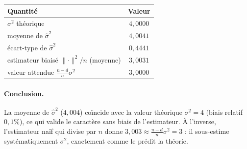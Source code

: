 \documentclass[11pt,a4paper]{article}
\theoremstyle{plain}
\begin{document}
\begin{center}
\begin{tabular}{lc}
\toprule
Quantité & Valeur \\
\midrule
$\sigma^2$ théorique                              & $4{,}0000$ \\
moyenne de $\hat\sigma^2$                          & $4{,}0041$ \\
écart-type de $\hat\sigma^2$                       & $0{,}4441$ \\
estimateur biaisé $\lVert\cdot\rVert^2/n$ (moyenne) & $3{,}0031$ \\
valeur attendue $\frac{n-d}{n}\sigma^2$            & $3{,}0000$ \\
\bottomrule
\end{tabular}
\end{center}

\paragraph{Conclusion.} La moyenne de $\hat\sigma^2$ ($4{,}004$) coïncide avec la
valeur théorique $\sigma^2=4$ (biais relatif $0{,}1\%$), ce qui valide le
caractère sans biais de l'estimateur. À l'inverse, l'estimateur naïf qui divise
par $n$ donne $3{,}003\approx\frac{n-d}{n}\sigma^2=3$ : il sous-estime
systématiquement $\sigma^2$, exactement comme le prédit la théorie.
\end{document}
